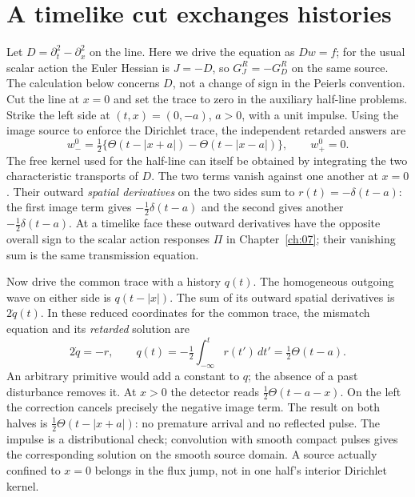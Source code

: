 \section{A timelike cut exchanges histories}
Let $D=\partial_t^2-\partial_x^2$ on the line. Here we drive the equation as $Dw=f$; for the usual scalar action the Euler Hessian is $J=-D$, so $G_J^{R}=-G_D^{R}$ on the same source. The calculation below concerns $D$, not a change of sign in the Peierls convention. Cut the line at $x=0$ and set the trace to zero in the auxiliary half-line problems. Strike the left side at $(t,x)=(0,-a)$, $a>0$, with a unit impulse. Using the image source to enforce the Dirichlet trace, the independent retarded answers are
\[
 w_-^0=\tfrac12\{\Theta(t-|x+a|)-\Theta(t-|x-a|)\},\qquad w_+^0=0.
\]
The free kernel used for the half-line can itself be obtained by integrating the two characteristic transports of $D$. The two terms vanish against one another at $x=0$. Their outward \emph{spatial derivatives} on the two sides sum to $r(t)=-\delta(t-a)$: the first image term gives $-\tfrac12\delta(t-a)$ and the second gives another $-\tfrac12\delta(t-a)$. At a timelike face these outward derivatives have the opposite overall sign to the scalar action responses $\Pi$ in Chapter~\ref{ch:07}; their vanishing sum is the same transmission equation.

Now drive the common trace with a history $q(t)$. The homogeneous outgoing wave on either side is $q(t-|x|)$. The sum of its outward spatial derivatives is $2\dot q(t)$. In these reduced coordinates for the common trace, the mismatch equation and its \emph{retarded} solution are
\begin{equation}
 2\dot q=-r,\qquad q(t)=-\tfrac12\int_{-\infty}^{t}r(t')\,dt'
             =\tfrac12\Theta(t-a).\label{eq:retarded-trace}
\end{equation}
An arbitrary primitive would add a constant to $q$; the absence of a past disturbance removes it. At $x>0$ the detector reads $\tfrac12\Theta(t-a-x)$. On the left the correction cancels precisely the negative image term. The result on both halves is $\tfrac12\Theta(t-|x+a|)$: no premature arrival and no reflected pulse. The impulse is a distributional check; convolution with smooth compact pulses gives the corresponding solution on the smooth source domain. A source actually confined to $x=0$ belongs in the flux jump, not in one half's interior Dirichlet kernel.

